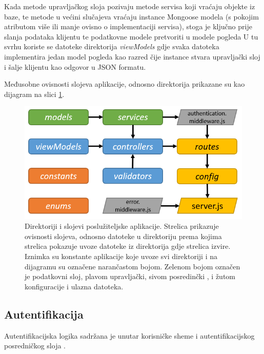 \documentclass[times, utf8, diplomski, numeric]{fer}
\newcommand{\razmaks}{\vspace{10pt}}
\begin{document}
Kada metode upravljačkog sloja pozivaju metode servisa koji vraćaju objekte iz baze, te metode u većini slučajeva vraćaju instance Mongoose modela (s pokojim atributom više ili manje ovisno o implementaciji servisa), stoga je ključno prije slanja podataka klijentu te podatkovne modele  pretvoriti u modele pogleda 
U tu svrhu koriste se datoteke direktorija \emph{viewModels} gdje svaka datoteka implementira jedan model pogleda kao razred čije instance stvara upravljački sloj i šalje klijentu kao odgovor u JSON formatu.

Međusobne ovisnosti slojeva aplikacije, odnosno direktorija prikazane su kao dijagram na slici \ref{fig:server_files}.

\begin{figure}[!htb] %
    \centering
    \includegraphics[width=13cm]{images/server_files.png}
    \caption{
        Direktoriji i slojevi poslužiteljske aplikacije.
        Strelica prikazuje ovisnosti slojeva, odnosno datoteke u direktoriju prema kojima strelica pokazuje uvoze datoteke iz direktorija gdje strelica izvire.
        Iznimka su konstante aplikacije koje uvoze svi direktoriji i na dijagramu su označene narančastom bojom.
        Zelenom bojom označen je podatkovni sloj, plavom upravljački, sivom posredinčki , i žutom konfiguracije i ulazna datoteka.
    }
    \label{fig:server_files}
\end{figure}
\razmaks

\razmaks
\subsection{Autentifikacija} \label{sec:auth}

Autentifikacijska logika sadržana je unutar korisničke sheme i autentifikacijskog posredničkog sloja .
\end{document}
